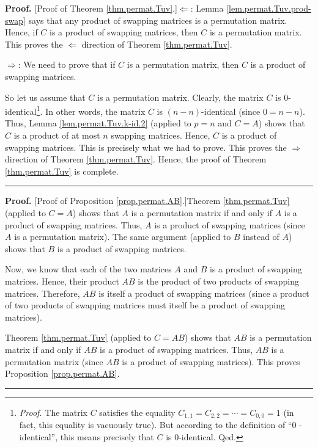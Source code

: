 \documentclass[numbers=enddot,12pt,final,onecolumn,notitlepage]{scrartcl}%
\theoremstyle{definition}
\newenvironment{proof}[1][Proof]{\noindent\textbf{#1.} }{\ \rule{0.5em}{0.5em}}
\begin{document}
\begin{proof}
[Proof of Theorem \ref{thm.permat.Tuv}.]$\Longleftarrow$: Lemma
\ref{lem.permat.Tuv.prod-swap} says that any product of swapping matrices is a
permutation matrix. Hence, if $C$ is a product of swapping matrices, then $C$
is a permutation matrix. This proves the $\Longleftarrow$ direction of Theorem
\ref{thm.permat.Tuv}.

$\Longrightarrow$: We need to prove that if $C$ is a permutation matrix, then
$C$ is a product of swapping matrices.

So let us assume that $C$ is a permutation matrix. Clearly, the matrix $C$ is
$0$-identical\footnote{\textit{Proof.} The matrix $C$ satisfies the equality
$C_{1,1}=C_{2,2}=\cdots=C_{0,0}=1$ (in fact, this equality is vacuously true).
But according to the definition of \textquotedblleft$0$%
-identical\textquotedblright, this means precisely that $C$ is $0$-identical.
Qed.}. In other words, the matrix $C$ is $\left(  n-n\right)  $-identical
(since $0=n-n$). Thus, Lemma \ref{lem.permat.Tuv.k-id.2} (applied to $p=n$ and
$C=A$) shows that $C$ is a product of at most $n$ swapping matrices. Hence,
$C$ is a product of swapping matrices. This is precisely what we had to prove.
This proves the $\Longrightarrow$ direction of Theorem \ref{thm.permat.Tuv}.
Hence, the proof of Theorem \ref{thm.permat.Tuv} is complete.
\end{proof}

\begin{proof}
[Proof of Proposition \ref{prop.permat.AB}.]Theorem \ref{thm.permat.Tuv}
(applied to $C=A$) shows that $A$ is a permutation matrix if and only if $A$
is a product of swapping matrices. Thus, $A$ is a product of swapping matrices
(since $A$ is a permutation matrix). The same argument (applied to $B$ instead
of $A$) shows that $B$ is a product of swapping matrices.

Now, we know that each of the two matrices $A$ and $B$ is a product of
swapping matrices. Hence, their product $AB$ is the product of two products of
swapping matrices. Therefore, $AB$ is itself a product of swapping matrices
(since a product of two products of swapping matrices must itself be a product
of swapping matrices).

Theorem \ref{thm.permat.Tuv} (applied to $C=AB$) shows that $AB$ is a
permutation matrix if and only if $AB$ is a product of swapping matrices.
Thus, $AB$ is a permutation matrix (since $AB$ is a product of swapping
matrices). This proves Proposition \ref{prop.permat.AB}.
\end{proof}
\end{document}
